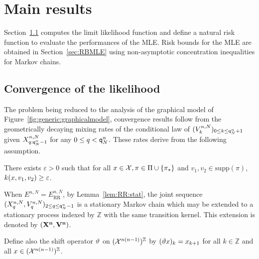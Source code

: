 \section{Main results}\label{sec:main}
Section~\ref{sec:ConvLikelihood} computes the limit likelihood function and define a natural risk function to evaluate the performances of the MLE. Risk bounds for the MLE are obtained in Section~\ref{sec:RBMLE} using non-asymptotic concentration inequalities for Markov chains.


\subsection{Convergence of the likelihood}\label{sec:ConvLikelihood}
The problem being reduced to the analysis of the graphical model of Figure~\ref{fig:generic:graphicalmodel}, convergence results follow from the geometrically decaying mixing rates of the conditional law of $(V^{n,N}_{k})_{0\le k \le {\mathsf{q}}^{n}_{N}+1}$ given $X^{n,N}_{q:{\mathsf{q}}^{n}_{N}-1}$ for any $0\le q< {\mathsf{q}}^{n}_{N}$. These rates derive from the following assumption.
\begin{hypH}
\label{assum:strongmix}
There exists $\varepsilon>0$ such that for all $x\in\mathcal{X}, \pi\in\Pi\cup\{\pi_{\star}\}$ and $v_1,v_2 \in \mathrm{supp}(\pi)$, $k(x,v_{1},v_2)\ge\varepsilon$.
\end{hypH}
When $E^{n,N}=E^{n,N}_{\text{RR}}$, by Lemma~\ref{lem:RR:stat}, 
the joint sequence $(X^{n,N}_q,V^{n,N}_q)_{2\le q \le {\mathsf{q}}^{n}_{N}-1}$ is a stationary Markov chain which may be extended to a stationary process indexed by $\mathbb{Z}$ with the same transition kernel. This extension is denoted by $({\bf X^{n}},{\bf V^{n}})$. 

Define also the shift operator $\vartheta$ on $(\mathcal{X}^{n(n-1)})^{\mathbb{Z}}$ by $(\vartheta x)_k = x_{k+1}$ for all $k\in\mathbb{Z}$ and all $x\in (\mathcal{X}^{n(n-1)})^{\mathbb{Z}}$.

